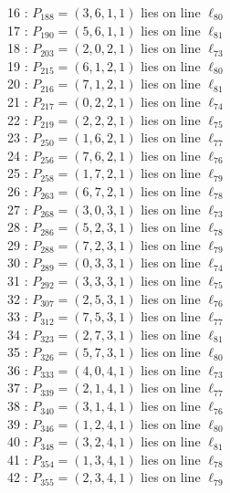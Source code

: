 \documentclass{article}
\begin{document}
{\begin{multicols}{2}
16 : $P_{188}=( 3, 6, 1, 1 )$ lies on line $\ell_{80}$\\
17 : $P_{190}=( 5, 6, 1, 1 )$ lies on line $\ell_{81}$\\
18 : $P_{203}=( 2, 0, 2, 1 )$ lies on line $\ell_{73}$\\
19 : $P_{215}=( 6, 1, 2, 1 )$ lies on line $\ell_{80}$\\
20 : $P_{216}=( 7, 1, 2, 1 )$ lies on line $\ell_{81}$\\
21 : $P_{217}=( 0, 2, 2, 1 )$ lies on line $\ell_{74}$\\
22 : $P_{219}=( 2, 2, 2, 1 )$ lies on line $\ell_{75}$\\
23 : $P_{250}=( 1, 6, 2, 1 )$ lies on line $\ell_{77}$\\
24 : $P_{256}=( 7, 6, 2, 1 )$ lies on line $\ell_{76}$\\
25 : $P_{258}=( 1, 7, 2, 1 )$ lies on line $\ell_{79}$\\
26 : $P_{263}=( 6, 7, 2, 1 )$ lies on line $\ell_{78}$\\
27 : $P_{268}=( 3, 0, 3, 1 )$ lies on line $\ell_{73}$\\
28 : $P_{286}=( 5, 2, 3, 1 )$ lies on line $\ell_{78}$\\
29 : $P_{288}=( 7, 2, 3, 1 )$ lies on line $\ell_{79}$\\
30 : $P_{289}=( 0, 3, 3, 1 )$ lies on line $\ell_{74}$\\
31 : $P_{292}=( 3, 3, 3, 1 )$ lies on line $\ell_{75}$\\
32 : $P_{307}=( 2, 5, 3, 1 )$ lies on line $\ell_{76}$\\
33 : $P_{312}=( 7, 5, 3, 1 )$ lies on line $\ell_{77}$\\
34 : $P_{323}=( 2, 7, 3, 1 )$ lies on line $\ell_{81}$\\
35 : $P_{326}=( 5, 7, 3, 1 )$ lies on line $\ell_{80}$\\
36 : $P_{333}=( 4, 0, 4, 1 )$ lies on line $\ell_{73}$\\
37 : $P_{339}=( 2, 1, 4, 1 )$ lies on line $\ell_{77}$\\
38 : $P_{340}=( 3, 1, 4, 1 )$ lies on line $\ell_{76}$\\
39 : $P_{346}=( 1, 2, 4, 1 )$ lies on line $\ell_{80}$\\
40 : $P_{348}=( 3, 2, 4, 1 )$ lies on line $\ell_{81}$\\
41 : $P_{354}=( 1, 3, 4, 1 )$ lies on line $\ell_{78}$\\
42 : $P_{355}=( 2, 3, 4, 1 )$ lies on line $\ell_{79}$\\

\end{multicols}}
\end{document}
